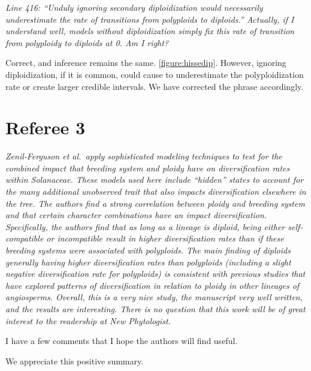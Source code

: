 \documentclass[11pt]{article}
\renewenvironment{quote}{\bigskip\noindent\itshape\ignorespaces}{\smallskip}
\begin{document}
\begin{quote}
Line 416: ``Unduly ignoring secondary diploidization would necessarily underestimate the rate of transitions from polyploids to diploids.''
Actually, if I understand well, models without diploidization simply fix this rate of transition from polyploidy to diploids at 0.
Am I right?
\end{quote}

Correct, and inference remains the same. \cref{figure:hissedip}. 
However, ignoring diploidization, if it is common, could cause to underestimate the polyploidization rate or create larger credible intervals.
We have corrected the phrase accordingly.


\section{Referee 3}
\vspace{-11pt}

\begin{quote}
Zenil-Ferguson et al.\ apply sophisticated modeling techniques to test for the combined impact that breeding system and ploidy have on diversification rates within Solanaceae.
These models used here include ``hidden'' states to account for the many additional unobserved trait that also impacts diversification elsewhere in the tree.
The authors find a strong correlation between ploidy and breeding system and that certain character combinations have an impact diversification.
Specifically, the authors find that as long as a lineage is diploid, being either self-compatible or incompatible result in higher diversification rates than if these breeding systems were associated with polyploids.
The main finding of diploids generally having higher diversification rates than polyploids (including a slight negative diversification rate for polyploids) is consistent with previous studies that have explored patterns of diversification in relation to ploidy in other lineages of angiosperms.
Overall, this is a very nice study, the manuscript very well written, and the results are interesting.
There is no question that this work will be of great interest to the readership at New Phytologist.

I have a few comments that I hope the authors will find useful.
\end{quote}

We appreciate this positive summary.
\end{document}
